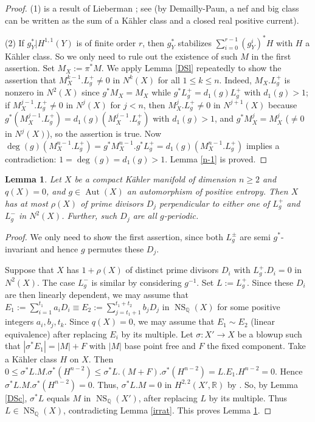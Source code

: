 \documentclass[11pt,a4paper,psamsfonts]{amsart}
\theoremstyle{plain}
\newtheorem{lemma}[thm]{Lemma}
\theoremstyle{definition}
\theoremstyle{remark}
\begin{document}
\begin{proof}
(1) is a result of Lieberman \cite[Proposition 2.2]{Li}; see \cite[Lemma 2.23]{Z2}
(by Demailly-Paun, a nef and big class can be written as the sum
of a K\"ahler class and a closed real positive current).

(2) If $g_Y^* | H^{1,1}(Y)$ is of finite order $r$, then
$g_Y^*$ stabilizes $\sum_{i=0}^{r-1} (g_Y^i)^*H$ with $H$ a K\"ahler class.
So we only need to rule out the existence of such $M$ in the first assertion.
Set $M_X := \pi^*M$. We apply Lemma \ref{DSl} repeatedly to
show the assertion that $M_X^{k-1} . L_g^+ \ne 0$ in $N^k(X)$ for all $1 \le k \le n$.
Indeed, $M_X . L_g^+$ is nonzero in $N^2(X)$ since $g^*M_X = M_X$ while $g^*L_g^+ = d_1(g) L_g^+$
with $d_1(g) > 1$; if $M_X^{j-1} . L_g^+ \ne 0$ in $N^j(X)$ for $j < n$, then
$M_X^j . L_g^+ \ne 0$ in $N^{j+1}(X)$ because $g^*(M_X^{j-1} . L_g^+) = d_1(g)(M_X^{j-1} . L_g^+)$
with $d_1(g) > 1$, and $g^*M_X^j = M_X^j$ ($\ne 0$ in $N^j(X)$), so the assertion is true.
Now $\deg(g) (M_X^{n-1} . L_g^+) = g^*M_X^{n-1} . g^*L_g^+ = d_1(g)(M_X^{n-1} . L_g^+)$
implies a contradiction:
$1 = \deg(g) = d_1(g) > 1$.
Lemma \ref{n-1} is proved.
\end{proof}

\begin{lemma}\label{LgNullD}
Let $X$ be a compact K\"ahler manifold of dimension $n \ge 2$ and $q(X) = 0$, and $g \in {\operatorname{Aut}}(X)$
an automorphism of positive entropy.
Then $X$ has at most $\rho(X)$ of prime divisors $D_j$
perpendicular to either one of $L_g^+$ and $L_g^-$
in $N^2(X)$. Further, such $D_j$ are all $g$-periodic.
\end{lemma}

\begin{proof}
We only need to show the first assertion, since
both $L_g^{\pm}$ are semi $g^*$-invariant and hence $g$ permutes these $D_j$.

Suppose that
$X$ has $1 + \rho(X)$ of distinct prime divisors
$D_i$ with $L_g^+ . D_i = 0$
in $N^2(X)$.
The case $L_g^-$ is similar by considering $g^{-1}$. Set
$L := L_g^+$.
Since these $D_i$ are then linearly dependent, we may assume that
$E_1 := \sum_{i=1}^{t_1} a_i D_i \equiv E_2 := \sum_{j=t_1+1}^{t_1+t_2} b_j D_j$
in ${\operatorname{NS}}_{\mathbb{Q}}(X)$
for some positive integers $a_i, b_j, t_k$.
Since $q(X) = 0$, we may assume that $E_1 \sim E_2$ (linear equivalence)
after replacing $E_i$ by its multiple.
Let $\sigma: X' \to X$ be a blowup such that $|\sigma^*E_1| = |M| + F$
with $|M|$ base point free and $F$ the fixed component.
Take a K\"ahler class $H$ on $X$. Then $0 \le \sigma^*L . M . \sigma^*(H^{n-2}) \le
\sigma^*L . (M + F) . \sigma^*(H^{n-2}) = L . E_1 . H^{n-2} = 0$.
Hence $\sigma^*L . M . \sigma^*(H^{n-2}) = 0$. Thus, $\sigma^*L . M = 0$
in $H^{2,2}(X', {\mathbb{R}})$ by \cite[Appendix A, Lemmas A.4 and A.5]{NZ}.
So, by Lemma \ref{DSc}, $\sigma^*L$ equals $M$ in ${\operatorname{NS}}_{\mathbb{Q}}(X')$,
after replacing $L$ by its multiple.
Thus $L \in {\operatorname{NS}}_{\mathbb{Q}}(X)$, contradicting
Lemma \ref{irrat}.
This proves Lemma \ref{LgNullD}.
\end{proof}
\end{document}
